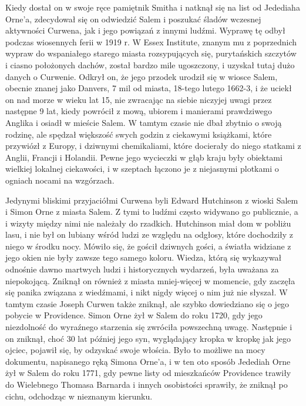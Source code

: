 Kiedy dostał on w swoje ręce pamiętnik Smitha i natknął się na list od Jedediaha Orne'a, zdecydował się on odwiedzić Salem i poszukać śladów wczesnej aktywności Curwena, jak i jego powiązań z innymi ludźmi. Wyprawę tę odbył podczas wiosennych ferii w 1919 r. W Essex Institute, znanym mu z poprzednich wypraw do wspaniałego starego miasta rozsypujących się, purytańskich szczytów i ciasno położonych dachów, został bardzo mile ugoszczony, i uzyskał tutaj dużo danych o Curwenie. Odkrył on, że jego przodek urodził się w wiosce Salem, obecnie znanej jako Danvers, 7 mil od miasta, 18-tego lutego 1662-3, i że uciekł on nad morze w wieku lat 15, nie zwracając na siebie niczyjej uwagi przez następne 9 lat, kiedy powrócił z mową, ubiorem i manierami prawdziwego Anglika i osiadł w mieście Salem. W tamtym czasie nie dbał zbytnio o swoją rodzinę, ale spędzał większość swych godzin z ciekawymi książkami, które przywiózł z Europy, i dziwnymi chemikaliami, które docierały do niego statkami z Anglii, Francji i Holandii. Pewne jego wycieczki w głąb kraju były obiektami wielkiej lokalnej ciekawości, i w szeptach łączono je z niejasnymi plotkami o ogniach nocami na wzgórzach. 

Jedynymi bliskimi przyjaciółmi Curwena byli Edward Hutchinson z wioski Salem i Simon Orne z miasta Salem. Z tymi to ludźmi często widywano go publicznie, a i wizyty między nimi nie należały do rzadkich. Hutchinson miał dom w pobliżu lasu, i nie był on lubiany wśród ludzi ze względu na odgłosy, które dochodziły z niego w środku nocy. Mówiło się, że gościł dziwnych gości, a światła widziane z jego okien nie były zawsze tego samego koloru. Wiedza, którą się wykazywał odnośnie dawno martwych ludzi i historycznych wydarzeń, była uważana za niepokojącą. Zniknął on również z miasta mniej-więcej w momencie, gdy zaczęła się panika związana z wiedźmami, i nikt nigdy więcej o nim już nie słyszał. W tamtym czasie Joseph Curwen także zniknął, ale szybko dowiedziano się o jego pobycie w Providence. Simon Orne żył w Salem do roku 1720, gdy jego niezdolność do wyraźnego starzenia się zwróciła powszechną uwagę. Następnie i on zniknął, choć 30 lat później jego syn, wyglądający kropka w kropkę jak jego ojciec, pojawił się, by odzyskać swoje włościa. Było to możliwe na mocy dokumentu, napisanego ręką Simona Orne'a, i w ten oto sposób Jedediah Orne żył w Salem do roku 1771, gdy pewne listy od mieszkańców Providence trawiły do Wielebnego Thomasa Barnarda i innych osobistości sprawiły, że zniknął po cichu, odchodząc w nieznanym kierunku.  

